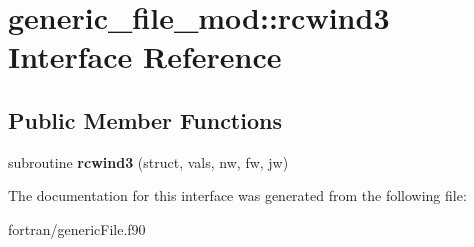 \hypertarget{interfacegeneric__file__mod_1_1rcwind3}{}\section{generic\+\_\+file\+\_\+mod\+:\+:rcwind3 Interface Reference}
\label{interfacegeneric__file__mod_1_1rcwind3}
\subsection*{Public Member Functions}
\begin{DoxyCompactItemize}
\item 
\mbox{\label{interfacegeneric__file__mod_1_1rcwind3_aff2e64e634f120518e88c494d1f70657}} 
subroutine {\bfseries rcwind3} (struct, vals, nw, fw, jw)
\end{DoxyCompactItemize}


The documentation for this interface was generated from the following file\+:\begin{DoxyCompactItemize}
\item 
fortran/generic\+File.\+f90\end{DoxyCompactItemize}
